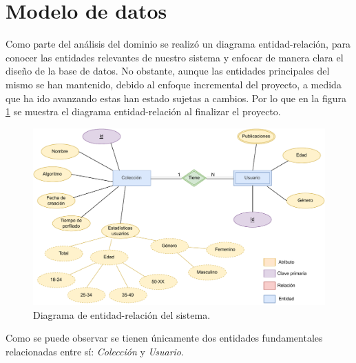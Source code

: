 \section{Modelo de datos}
Como parte del análisis del dominio se realizó un diagrama entidad-relación, para conocer las entidades relevantes de nuestro sistema y enfocar de manera clara el diseño de la base de datos. No obstante, aunque las entidades principales del mismo se han mantenido, debido al enfoque incremental del proyecto, a medida que ha ido avanzando estas han estado sujetas a cambios. Por lo que en la figura \ref{fig:diagrama/ER} se muestra el diagrama entidad-relación al finalizar el proyecto.

\begin{figure}
  \centering
  \includegraphics[width=\textwidth]{imaxes/diagramas/ER-diagram.pdf}
  \caption{Diagrama de entidad-relación del sistema.}
  \label{fig:diagrama/ER}
\end{figure}

Como se puede observar se tienen únicamente dos entidades fundamentales relacionadas entre sí: \textit{Colección} y \textit{Usuario}. 
